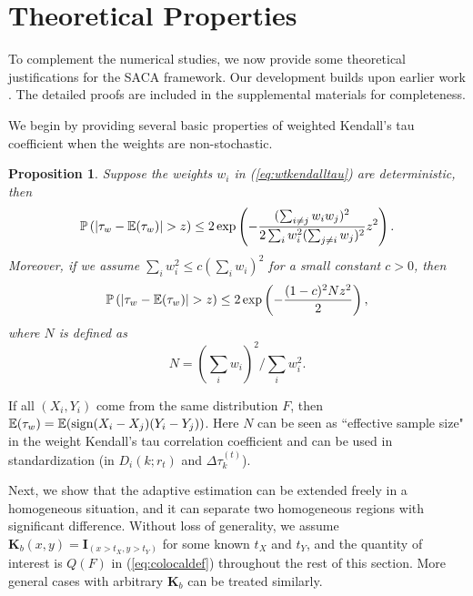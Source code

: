 \documentclass[10pt,twocolumn,twoside]{IEEEtran}
\newtheorem{proposition}{Proposition}
\def\sign{{\rm sign}}
\def\PP{\mathbb{P}}
\def\EE{\mathbb{E}}
\def\bK{\mathbf K}
\begin{document}
\section{Theoretical Properties}
\label{sc:theprop}

To complement the numerical studies, we now provide some theoretical justifications for the SACA framework. Our development builds upon earlier work \cite{Polzehl2000,Polzehl2006,becker2013}. The detailed proofs are included in the supplemental materials for completeness.

We begin by providing several basic properties of weighted Kendall's tau coefficient when the weights are non-stochastic.
\begin{proposition}
\label{pr:basickendall}
Suppose the weights $w_i$ in (\ref{eq:wtkendalltau}) are deterministic, then
$$
\PP\left(\left|\tau_w-\EE(\tau_w)\right|>z\right)\le 2\exp\left( -{(\sum_{i\ne j}w_iw_j)^2\over 2\sum_i w_i^2(\sum_{j\neq i}w_j)^2}z^2\right).
$$
 Moreover, if we assume $\sum_i w_i^2\le c(\sum_i w_i)^2$ for a small constant $c>0$, then
$$
\PP\left(\left|\tau_w-\EE(\tau_w)\right|>z\right)\le 2\exp\left(-{(1-c)^2Nz^2\over 2}\right),
$$
where $N$ is defined as
$$
N=\left(\sum_{i}w_i\right)^2/\sum_i w_i^2.
$$
\end{proposition}

If all $(X_i,Y_i)$ come from the same distribution $F$, then $\EE(\tau_w)=\EE(\sign(X_i-X_j)(Y_i-Y_j))$. Here $N$ can be seen as ``effective sample size" in the weight Kendall's tau correlation coefficient and can be used in standardization (in $D_i(k;r_t)$ and $\Delta \tau_k^{(t)}$).

Next, we show that the adaptive estimation can be extended freely in a homogeneous situation, and it can separate two homogeneous regions with significant difference. Without loss of generality, we assume $\bK_b(x,y)=\mathbf{I}_{(x>t_X,y>t_Y)}$  for some known $t_X$ and $t_Y$, and the quantity of interest is $Q(F)$ in (\ref{eq:colocaldef}) throughout the rest of this section. More general cases with arbitrary $\bK_b$ can be treated similarly.
\end{document}
